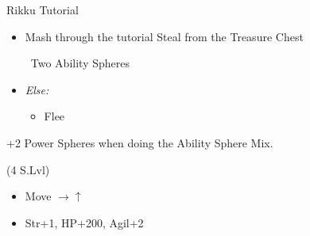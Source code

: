 \begin{battle}{Rikku Tutorial}
    \begin{itemize}
        \item Mash through the tutorial
        \rikkuf Steal from the Treasure Chest
        \begin{itemize}
            \rikkuf \od\ Two Ability Spheres
        \end{itemize}
        \item \textit{Else:}
        \begin{itemize}
            \rikkuf \od\ Two Potions
            \rikkuf Defend
            \item Flee
        \end{itemize}
    \end{itemize}
    +2 Power Spheres when doing the Ability Sphere Mix.
\end{battle}
\begin{spheregrid}
    \begin{itemize}
        \tidusf (4 S.Lvl)
        \begin{itemize}
            \item Move $\rightarrow\uparrow$
            \item Str+1, HP+200, Agil+2
        \end{itemize}
    \end{itemize}
\end{spheregrid}
